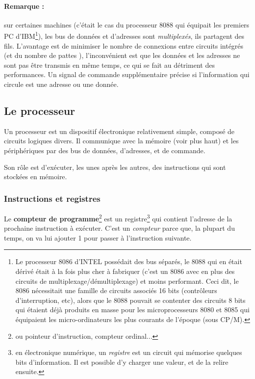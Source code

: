 \begin{multicols}{2}
\paragraph{Remarque :}  sur certaines machines (c'était le cas du 
processeur 8088 qui équipait les premiers PC d'IBM\footnote{Le
  processeur 8086 d'INTEL possédait des bus séparés, le 8088 qui en
  était dérivé était à la fois plus cher à fabriquer (c'est un 8086
  avec en plus des circuits de multiplexage/démultiplexage) et moins
  performant. Ceci dit, le 8086 nécessitait une famille de circuits
  associés 16 bits (contrôleurs d'interruption, etc), alors que le
  8088 pouvait se contenter des circuits 8 bits qui étaient déjà
  produits en masse pour les microprocesseurs 8080 et 8085 qui
  équipaient les micro-ordinateurs les plus courants de l'époque (sous
  CP/M).}), les bus de données et d'adresses sont \emph{multiplexés},
ils partagent des fils. L'avantage est de minimiser le nombre de
connexions entre circuits intégrés (et du nombre de pattes ),
l'inconvénient est que les données et les adresses ne sont pas être
transmis en même temps, ce qui se fait au détriment des performances.
Un signal de commande supplémentaire précise si l'information qui
circule est une adresse ou une donnée.

\subsection{Le processeur}

Un processeur est un dispositif électronique relativement simple, composé
de circuits logiques divers.  Il communique avec la mémoire (voir plus haut)
et les périphériques par des bus de données, d'adresses, et de commande.

Son rôle est d'exécuter, les unes après les autres, des instructions
qui sont stockées en mémoire.

\subsubsection{Instructions et registres}

Le \textbf{compteur de programme}\footnote{ou pointeur 
d'instruction, compteur ordinal...} est un registre\footnote{en électronique numérique, un \emph{registre}
est un circuit qui mémorise quelques bits d'information. Il est possible d'y 
charger une valeur, et de la relire ensuite.
} qui contient l'adresse de la prochaine
instruction à exécuter.  C'est un \emph{compteur} parce que, la plupart
 du temps, on va lui ajouter 1 pour passer à l'instruction suivante.


\end{multicols}
